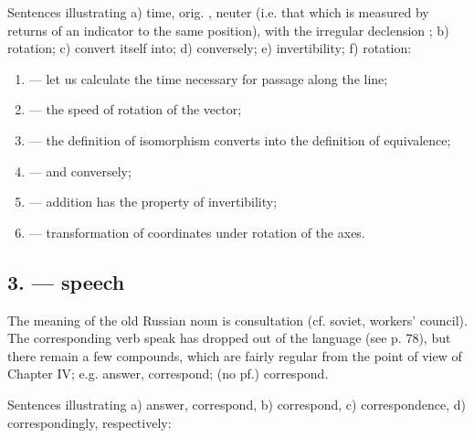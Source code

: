 Sentences illustrating a)  time, orig. , neuter (i.e. that which is measured by returns of an indicator to the same position), with the irregular declension ; b)  rotation; c)  convert itself into; d)  conversely; e)  invertibility; f)  rotation:

\begin{enumerate}[label=\alph*)]
\item {} --- let us calculate the time necessary for passage along the line;
\item {} --- the speed of rotation of the vector;
\item {} --- the definition of isomorphism converts into the definition of equivalence;
\item {} --- and conversely;
\item {} --- addition has the property of invertibility;
\item {} --- transformation of coordinates under rotation of the axes.
\end{enumerate}

\subsection*{3.  --- speech}

The meaning of the old Russian noun  is consultation (cf.  soviet, workers' council). The corresponding verb  speak has dropped out of the language (see p. 78), but there remain a few compounds, which are fairly regular from the point of view of Chapter IV; e.g.  answer, correspond;  (no pf.) correspond.

Sentences illustrating a)  answer, correspond, b)  correspond, c)  correspondence, d)  correspondingly, respectively:

